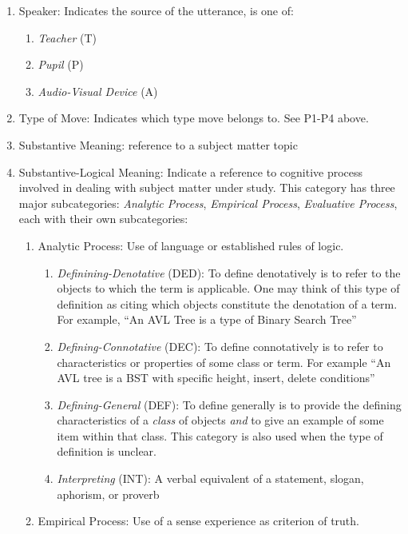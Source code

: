 \documentclass[conference]{IEEEtran}
\begin{document}
\begin{enumerate}
  \item{Speaker}: Indicates the source of the utterance, is one of:
  \begin{enumerate}
    \item \emph{Teacher} (T)
    \item \emph{Pupil} (P)
    \item \emph{Audio-Visual Device} (A)
  \end{enumerate}
  \item{Type of Move}: Indicates which type move belongs to. See P1-P4 above.
  \item{Substantive Meaning}: reference to a subject matter topic
  \item{Substantive-Logical Meaning}: Indicate a reference to cognitive process involved
    in dealing with subject matter under study. This category has three major
    subcategories: \emph{Analytic Process}, \emph{Empirical Process},
    \emph{Evaluative Process}, each with their own subcategories:
  \begin{enumerate}
    \item{Analytic Process}: Use of language or established rules of logic.
    \begin{enumerate}
      \item \emph{Definining-Denotative} (DED): To define denotatively is to
        refer to the objects to which the term is applicable. One may think of
        this type of definition as citing which objects constitute the
        denotation of a term. For example, ``An AVL Tree is a type of Binary
        Search Tree''
      \item \emph{Defining-Connotative} (DEC): To define connotatively is to
        refer to characteristics or properties of some class or term. For example ``An
        AVL tree is a BST with specific height, insert, delete conditions''
      \item \emph{Defining-General} (DEF): To define generally is to provide the
        defining characteristics of a \emph{class} of objects \emph{and} to give
        an example of some item within that class. This category is also used
        when the type of definition is unclear.
      \item \emph{Interpreting} (INT): A verbal equivalent of a statement, slogan, aphorism, or proverb
      \end{enumerate}
    \item{Empirical Process}: Use of a sense experience as criterion of truth.

\end{enumerate}
\end{enumerate}
\end{document}

